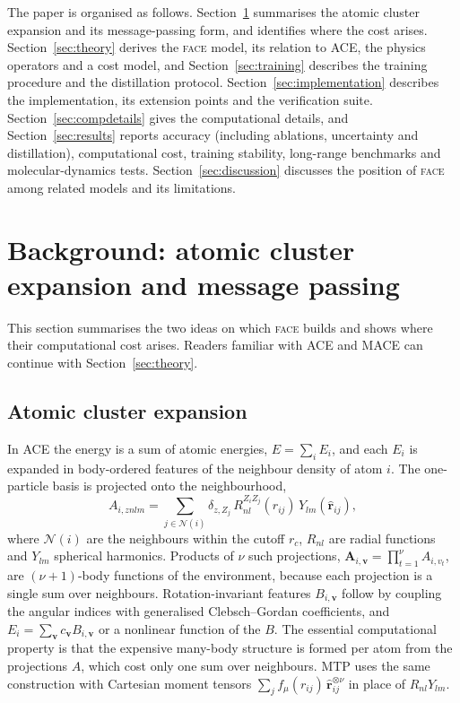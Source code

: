 \documentclass[journal=jctcce,manuscript=article,layout=traditional]{achemso}
\newcommand{\vect}[1]{\bm{#1}}
\newcommand{\FACE}{\textup{\textsc{face}}}
\begin{document}
The paper is organised as follows. Section~\ref{sec:background} summarises the atomic cluster expansion and its
message-passing form, and identifies where the cost arises. Section~\ref{sec:theory} derives the \FACE{} model, its
relation to ACE, the physics operators and a cost model, and Section~\ref{sec:training} describes the training
procedure and the distillation protocol.
Section~\ref{sec:implementation} describes the implementation, its extension points and the verification suite.
Section~\ref{sec:compdetails} gives the computational details, and Section~\ref{sec:results} reports accuracy
(including ablations, uncertainty and distillation), computational cost, training stability, long-range benchmarks
and molecular-dynamics tests.
Section~\ref{sec:discussion} discusses the position of \FACE{} among related models and its limitations.

\section{Background: atomic cluster expansion and message passing}
\label{sec:background}
This section summarises the two ideas on which \FACE{} builds and shows where their computational cost arises.
Readers familiar with ACE and MACE can continue with Section~\ref{sec:theory}.

\subsection{Atomic cluster expansion}
In ACE\cite{drautz2019,dusson2022ace} the energy is a sum of atomic energies, $E=\sum_iE_i$, and each $E_i$ is
expanded in body-ordered features of the neighbour density of atom $i$. The one-particle basis is projected onto
the neighbourhood,
\begin{equation}
A_{i,znlm}=\sum_{j\in\mathcal N(i)}\delta_{z,Z_j}\,R_{nl}^{Z_iZ_j}(r_{ij})\,Y_{lm}(\hat{\vect r}_{ij}),
\label{eq:aceA}
\end{equation}
where $\mathcal N(i)$ are the neighbours within the cutoff $r_c$, $R_{nl}$ are radial functions and $Y_{lm}$
spherical harmonics. Products of $\nu$ such projections,
$\boldsymbol{A}_{i,\boldsymbol v}=\prod_{t=1}^{\nu}A_{i,v_t}$, are $(\nu+1)$-body functions of the environment,
because each projection is a single sum over neighbours. Rotation-invariant features $B_{i,\boldsymbol v}$ follow by
coupling the angular indices with generalised Clebsch--Gordan coefficients, and $E_i=\sum_{\boldsymbol v}
c_{\boldsymbol v}B_{i,\boldsymbol v}$ or a nonlinear function of the $B$. The essential computational property is
that the expensive many-body structure is formed per atom from the projections $A$, which cost only one sum over
neighbours. MTP\cite{shapeev2016} uses the same construction with Cartesian moment tensors
$\sum_jf_\mu(r_{ij})\,\hat{\vect r}_{ij}^{\otimes\nu}$ in place of $R_{nl}Y_{lm}$.
\end{document}
